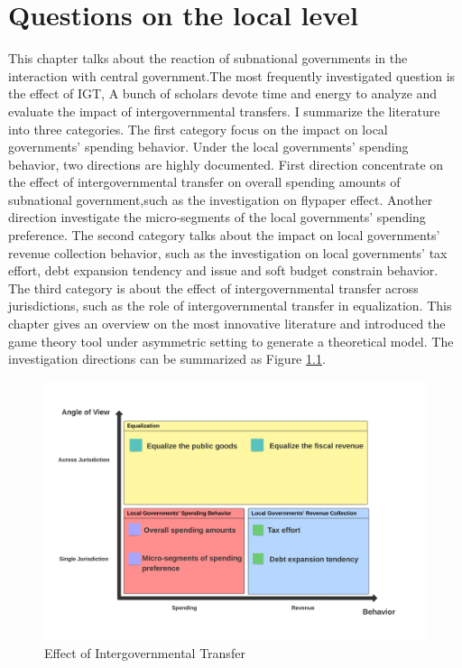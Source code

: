 
\chapter{Questions on the  local level}
This chapter talks about the reaction of subnational governments in the interaction with central government.The most frequently investigated question is the effect of IGT, A bunch of scholars devote time and energy to analyze and evaluate the impact of intergovernmental transfers. I summarize the literature into three categories. The first category focus on the impact on local governments' spending behavior. Under the local governments' spending behavior, two directions are highly documented. First direction concentrate on the effect of intergovernmental transfer on overall spending amounts of subnational government,such as the investigation on flypaper effect. Another direction investigate the micro-segments of the local governments' spending preference. The second category talks about the impact on local governments' revenue collection behavior, such as the investigation on local governments' tax effort, debt expansion tendency and issue and soft budget constrain behavior. The third category is about the effect of intergovernmental transfer across jurisdictions, such as the role of intergovernmental transfer in equalization. This chapter gives an overview on the most innovative literature and introduced the game theory tool under asymmetric setting to generate a theoretical model. The investigation directions can be summarized as Figure \ref*{Figure 3.1}.



\begin{figure}[H]
    \centering
    \includegraphics[scale=0.4]{Chapter-3/Figures/Effect of Intergovernmental Transfer.jpeg}
    \caption{Effect of Intergovernmental Transfer
        \texttt{} }
    \label{Figure 3.1}
\end{figure}




